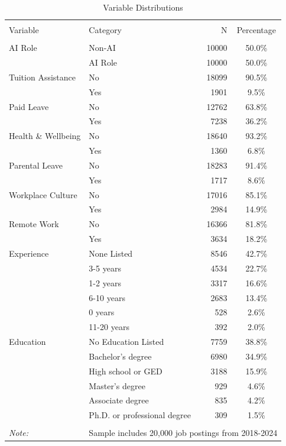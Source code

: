 \begin{table}[!htbp] \centering
\caption{Variable Distributions}
\label{tab:var_distributions}
\begin{tabular}{llrc}
\\[-1.8ex]\hline
\hline \\[-1.8ex]
Variable & Category & N & Percentage \\
\hline \\[-1.8ex]
AI Role & Non-AI & 10000 & 50.0\% \\
 & AI Role & 10000 & 50.0\% \\
Tuition Assistance & No & 18099 & 90.5\% \\
 & Yes & 1901 & 9.5\% \\
Paid Leave & No & 12762 & 63.8\% \\
 & Yes & 7238 & 36.2\% \\
Health \& Wellbeing & No & 18640 & 93.2\% \\
 & Yes & 1360 & 6.8\% \\
Parental Leave & No & 18283 & 91.4\% \\
 & Yes & 1717 & 8.6\% \\
Workplace Culture & No & 17016 & 85.1\% \\
 & Yes & 2984 & 14.9\% \\
Remote Work & No & 16366 & 81.8\% \\
 & Yes & 3634 & 18.2\% \\
Experience & None Listed & 8546 & 42.7\% \\
 & 3-5 years & 4534 & 22.7\% \\
 & 1-2 years & 3317 & 16.6\% \\
 & 6-10 years & 2683 & 13.4\% \\
 & 0 years & 528 & 2.6\% \\
 & 11-20 years & 392 & 2.0\% \\
Education & No Education Listed & 7759 & 38.8\% \\
 & Bachelor's degree & 6980 & 34.9\% \\
 & High school or GED & 3188 & 15.9\% \\
 & Master's degree & 929 & 4.6\% \\
 & Associate degree & 835 & 4.2\% \\
 & Ph.D. or professional degree & 309 & 1.5\% \\
\hline
\hline \\[-1.8ex]
\textit{Note:} & \multicolumn{3}{r}{Sample includes 20,000 job postings from 2018-2024} \\
\end{tabular}
\end{table}
